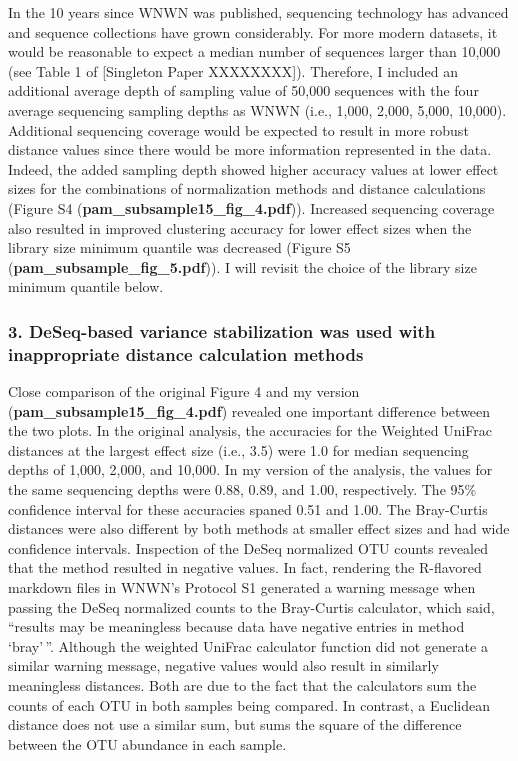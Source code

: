 \documentclass[
]{article}
\begin{document}
In the 10 years since WNWN was published, sequencing technology has
advanced and sequence collections have grown considerably. For more
modern datasets, it would be reasonable to expect a median number of
sequences larger than 10,000 (see Table 1 of {[}Singleton Paper
XXXXXXXX{]}). Therefore, I included an additional average depth of
sampling value of 50,000 sequences with the four average sequencing
sampling depths as WNWN (i.e., 1,000, 2,000, 5,000, 10,000). Additional
sequencing coverage would be expected to result in more robust distance
values since there would be more information represented in the data.
Indeed, the added sampling depth showed higher accuracy values at lower
effect sizes for the combinations of normalization methods and distance
calculations (Figure S4 (\textbf{pam\_subsample15\_fig\_4.pdf})).
Increased sequencing coverage also resulted in improved clustering
accuracy for lower effect sizes when the library size minimum quantile
was decreased (Figure S5 (\textbf{pam\_subsample\_fig\_5.pdf})). I will
revisit the choice of the library size minimum quantile below.

\hypertarget{deseq-based-variance-stabilization-was-used-with-inappropriate-distance-calculation-methods}{%
\subsubsection{3. DeSeq-based variance stabilization was used with
inappropriate distance calculation
methods}\label{deseq-based-variance-stabilization-was-used-with-inappropriate-distance-calculation-methods}}

Close comparison of the original Figure 4 and my version
(\textbf{pam\_subsample15\_fig\_4.pdf}) revealed one important
difference between the two plots. In the original analysis, the
accuracies for the Weighted UniFrac distances at the largest effect size
(i.e., 3.5) were 1.0 for median sequencing depths of 1,000, 2,000, and
10,000. In my version of the analysis, the values for the same
sequencing depths were 0.88, 0.89, and 1.00, respectively. The 95\%
confidence interval for these accuracies spaned 0.51 and 1.00. The
Bray-Curtis distances were also different by both methods at smaller
effect sizes and had wide confidence intervals. Inspection of the DeSeq
normalized OTU counts revealed that the method resulted in negative
values. In fact, rendering the R-flavored markdown files in WNWN's
Protocol S1 generated a warning message when passing the DeSeq
normalized counts to the Bray-Curtis calculator, which said, ``results
may be meaningless because data have negative entries in method
`bray'\,''. Although the weighted UniFrac calculator function did not
generate a similar warning message, negative values would also result in
similarly meaningless distances. Both are due to the fact that the
calculators sum the counts of each OTU in both samples being compared.
In contrast, a Euclidean distance does not use a similar sum, but sums
the square of the difference between the OTU abundance in each sample.
\end{document}
